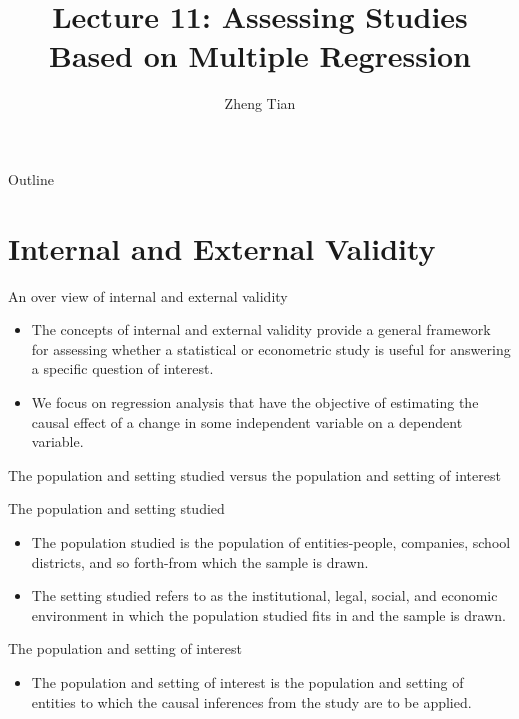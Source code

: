 \documentclass[presentation,10pt]{beamer}
\author{Zheng Tian}
\date{}
\title{Lecture 11: Assessing Studies Based on Multiple Regression}
\begin{document}
\maketitle
\begin{frame}{Outline}
\setcounter{tocdepth}{1}
\tableofcontents
\end{frame}


\section{Internal and External Validity}
\label{sec:org2bc7712}
\setcounter{tocdepth}{1}
\tableofcontents[currentsection]
\begin{frame}[label={sec:org2eeee5f}]{An over view of internal and external validity}
\begin{itemize}
\item The concepts of internal and external validity provide a general
framework for assessing whether a statistical or econometric study is
useful for answering a specific question of interest.
\end{itemize}

\vspace{0.1cm} 

\begin{itemize}
\item We focus on regression analysis that have the objective
of estimating the causal effect of a change in some independent
variable on a dependent variable.
\end{itemize}
\end{frame}

\begin{frame}[label={sec:orgcbe640f}]{The population and setting studied versus the population and setting of interest}
\begin{block}{The population and setting studied}
\begin{itemize}
\item The population studied is the population of entities-people,
companies, school districts, and so forth-from which the sample is
drawn.
\item The setting studied refers to as the institutional, legal, social,
and economic environment in which the population studied fits in and
the sample is drawn.
\end{itemize}
\end{block}

\begin{block}{The population and setting of interest}
\begin{itemize}
\item The population and setting of interest is the population
and setting of entities to which the causal inferences from the study
are to be applied.
\end{itemize}
\end{block}
\end{frame}
\end{document}
